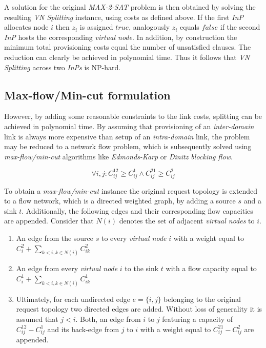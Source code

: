 \documentclass[prodmode,acmtomccap]{acmlarge}
\begin{document}
A solution for the original \emph{MAX-2-SAT} problem is then obtained by solving the resulting \emph{VN Splitting} instance, using costs as defined above. If the first \emph{InP} allocates node $i$
then $z_i$ is assigned $true$, analogously $z_i$ equals $false$ if the second \emph{InP} hosts the corresponding \emph{virtual node}. In addition, by construction the minimum 
total provisioning costs equal the number of unsatisfied clauses.
The reduction can clearly be achieved in polynomial time. Thus it follows that \emph{VN Splitting} across two \emph{InPs} is NP-hard.

\subsection{Max-flow/Min-cut formulation}
However, by adding some reasonable constraints to the link costs, splitting can be achieved in polynomial time. By assuming that provisioning of an \emph{inter-domain} link is always more expensive
than setup of an \emph{intra-domain} link, the problem may be reduced to a network flow problem, which is subsequently solved using \emph{max-flow/min-cut} algorithms like \emph{Edmonds-Karp}
or \emph{Dinitz blocking flow}.

\normalsize

$$
	\forall i,j: C_{ij}^{12} \geq C_{ij}^1 \wedge C_{ij}^{21} \geq C_{ij}^2
$$

\small

To obtain a \emph{max-flow/min-cut} instance the original request topology is extended to a flow network, which is a directed weighted graph, by adding a source $s$ and a sink $t$.
Additionally, the following edges and their corresponding flow capacities are appended. Consider that $N(i)$ denotes the set of adjacent \emph{virtual nodes} to $i$.

\begin{enumerate}
	\item An edge from the source $s$ to every \emph{virtual node} $i$ with a weight equal to $C_i^2 + \sum\limits_{k < i, k \in N(i)} C_{ik}^2$
	\item An edge from every \emph{virtual node} $i$ to the sink $t$ with a flow capacity equal to $C_i^1 + \sum\limits_{k < i, k \in N(i)} C_{ik}^1$
	\item Ultimately, for each undirected edge $e=\{i,j\}$ belonging to the original request topology two directed edges are added. Without loss of generality it is assumed that $j < i$.
		Both, an edge from $i$ to $j$ featuring a capacity of $C_{ij}^{12} - C_{ij}^1$ and its back-edge from $j$ to $i$ with a weight equal to $C_{ij}^{21} - C_{ij}^2$ are appended.
\end{enumerate}
\end{document}
